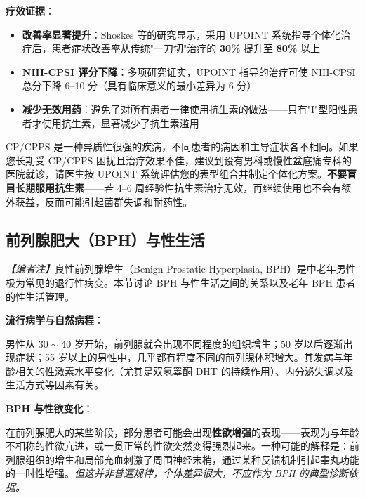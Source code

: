 \vspace{0.5em}
\noindent\textbf{疗效证据}：

\begin{itemize}[leftmargin=2cm]
	\item \textbf{改善率显著提升}：Shoskes 等的研究显示，采用 UPOINT 系统指导个体化治疗后，患者症状改善率从传统"一刀切"治疗的 \textbf{30\%} 提升至 \textbf{80\%} 以上
	\item \textbf{NIH-CPSI 评分下降}：多项研究证实，UPOINT 指导的治疗可使 NIH-CPSI 总分下降 6--10 分（具有临床意义的最小差异为 6 分）
	\item \textbf{减少无效用药}：避免了对所有患者一律使用抗生素的做法——只有"I"型阳性患者才使用抗生素，显著减少了抗生素滥用
\end{itemize}

\begin{tcolorbox}[colback=pink!5!white,colframe=red!50!black,title=贴心小叮咛]
CP/CPPS 是一种异质性很强的疾病，不同患者的病因和主导症状各不相同。如果您长期受 CP/CPPS 困扰且治疗效果不佳，建议到设有男科或慢性盆底痛专科的医院就诊，请医生按 UPOINT 系统评估您的表型组合并制定个体化方案。\textbf{不要盲目长期服用抗生素}——若 4--6 周经验性抗生素治疗无效，再继续使用也不会有额外获益，反而可能引起菌群失调和耐药性。
\end{tcolorbox}

\subsection{前列腺肥大（BPH）与性生活}

\noindent\textit{【编者注】}良性前列腺增生（Benign Prostatic Hyperplasia, BPH）是中老年男性极为常见的退行性病变。本节讨论 BPH 与性生活之间的关系以及老年 BPH 患者的性生活管理。

\vspace{0.5em}
\noindent\textbf{流行病学与自然病程}：

男性从 $30\sim40$ 岁开始，前列腺就会出现不同程度的组织增生；50 岁以后逐渐出现症状；55 岁以上的男性中，几乎都有程度不同的前列腺体积增大。其发病与年龄相关的性激素水平变化（尤其是双氢睾酮 DHT 的持续作用）、内分泌失调以及生活方式等因素有关。

\vspace{0.5em}
\noindent\textbf{BPH 与性欲变化}：

在前列腺肥大的某些阶段，部分患者可能会出现\textbf{性欲增强}的表现——表现为与年龄不相称的性欲亢进，或一贯正常的性欲突然变得强烈起来。一种可能的解释是：前列腺组织的增生和局部充血刺激了周围神经末梢，通过某种反馈机制引起睾丸功能的一时性增强。\textit{但这并非普遍规律，个体差异很大，不应作为 BPH 的典型诊断依据。}

